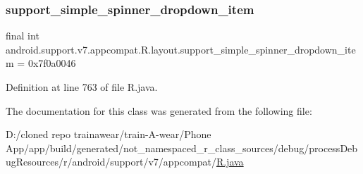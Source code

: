 \subsubsection{\texorpdfstring{support\_simple\_spinner\_dropdown\_item}{support\_simple\_spinner\_dropdown\_item}}
{\footnotesize\ttfamily final int android.\+support.\+v7.\+appcompat.\+R.\+layout.\+support\+\_\+simple\+\_\+spinner\+\_\+dropdown\+\_\+item = 0x7f0a0046\hspace{0.3cm}{\ttfamily [static]}}



Definition at line 763 of file R.\+java.



The documentation for this class was generated from the following file\+:\begin{DoxyCompactItemize}
\item 
D\+:/cloned repo trainawear/train-\/\+A-\/wear/\+Phone App/app/build/generated/not\+\_\+namespaced\+\_\+r\+\_\+class\+\_\+sources/debug/process\+Debug\+Resources/r/android/support/v7/appcompat/\mbox{\hyperlink{process_debug_resources_2r_2android_2support_2v7_2appcompat_2_r_8java}{R.\+java}}\end{DoxyCompactItemize}
